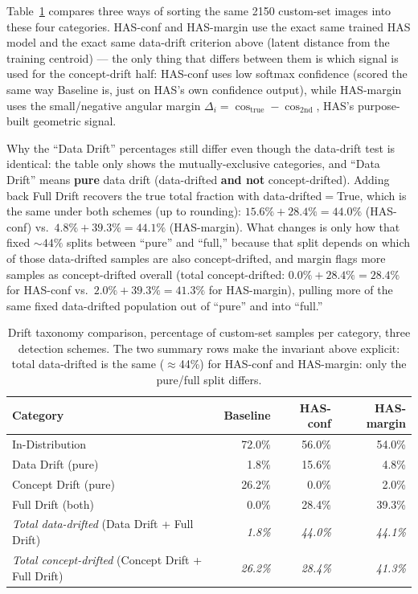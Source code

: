 Table~\ref{tab:extra_taxonomy} compares three ways of sorting the same 2150 custom-set images
into these four categories. HAS-conf and HAS-margin use the exact same trained HAS model and the
exact same data-drift criterion above (latent distance from the training centroid) — the only
thing that differs between them is which signal is used for the concept-drift half: HAS-conf uses
low softmax confidence (scored the same way Baseline is, just on HAS's own confidence output),
while HAS-margin uses the small/negative angular margin
$\Delta_i = \cos_{\mathrm{true}} - \cos_{\mathrm{2nd}}$, HAS's purpose-built geometric signal.

Why the ``Data Drift'' percentages still differ even though the data-drift test is
identical: the table only shows the mutually-exclusive categories, and ``Data Drift'' means
\textbf{pure} data drift (data-drifted \textbf{and not} concept-drifted). Adding back Full Drift
recovers the true total fraction with data-drifted$=$True, which is the same under both
schemes (up to rounding): $15.6\%+28.4\%=44.0\%$ (HAS-conf) vs.\ $4.8\%+39.3\%=44.1\%$
(HAS-margin). What changes is only how that fixed $\sim\!44\%$ splits between ``pure'' and
``full,'' because that split depends on which of those data-drifted samples are also
concept-drifted, and margin flags more samples as concept-drifted overall (total
concept-drifted: $0.0\%+28.4\%=28.4\%$ for HAS-conf vs.\ $2.0\%+39.3\%=41.3\%$ for HAS-margin),
pulling more of the same fixed data-drifted population out of ``pure'' and into ``full.''

\begin{table}[htbp]
\centering
\caption{Drift taxonomy comparison, percentage of custom-set samples per category, three detection schemes. 
The two summary rows make the invariant above explicit: total data-drifted is the same ($\approx$44\%) for 
HAS-conf and HAS-margin: only the pure/full split differs.}
\label{tab:extra_taxonomy}
\begin{tabular}{@{} l r r r @{}}
\toprule
\textbf{Category} & \textbf{Baseline} & \textbf{HAS-conf} & \textbf{HAS-margin} \\
\midrule
In-Distribution      & 72.0\% & 56.0\% & 54.0\% \\
Data Drift (pure)    &  1.8\% & 15.6\% &  4.8\% \\
Concept Drift (pure) & 26.2\% &  0.0\% &  2.0\% \\
Full Drift (both)    &  0.0\% & 28.4\% & 39.3\% \\
\midrule
\emph{Total data-drifted} (Data Drift + Full Drift)       & \emph{1.8\%} & \emph{44.0\%} & \emph{44.1\%} \\
\emph{Total concept-drifted} (Concept Drift + Full Drift) & \emph{26.2\%} & \emph{28.4\%} & \emph{41.3\%} \\
\bottomrule
\end{tabular}
\end{table}

